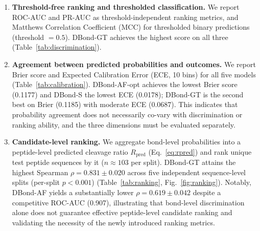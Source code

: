 \begin{enumerate}
    \item \textbf{Threshold-free ranking and thresholded classification.}
    We report ROC-AUC and PR-AUC as threshold-independent ranking metrics,
    and Matthews Correlation Coefficient (MCC) for thresholded binary
    predictions (threshold $=0.5$). DBond-GT achieves the highest score on
    all three (Table~\ref{tab:discrimination}).

    \item \textbf{Agreement between predicted probabilities and outcomes.}
    We report Brier score and Expected Calibration Error (ECE, 10 bins)
    for all five models (Table~\ref{tab:calibration}). DBond-AF-opt
    achieves the lowest Brier score (0.1177) and DBond-S the lowest ECE
    (0.0178); DBond-GT is the second best on Brier (0.1185) with moderate
    ECE (0.0687). This indicates that probability agreement does not
    necessarily co-vary with discrimination or ranking ability, and the
    three dimensions must be evaluated separately.

    \item \textbf{Candidate-level ranking.} We aggregate bond-level
    probabilities into a peptide-level predicted cleavage ratio
    $R_{\text{pred}}$ (Eq.~\ref{eq:rpred}) and rank unique test peptide
    sequences by it ($n \approx 103$ per split). DBond-GT attains the
    highest Spearman $\rho = 0.831 \pm 0.020$ across five independent
    sequence-level splits (per-split $p < 0.001$)
    (Table~\ref{tab:ranking}, Fig.~\ref{fig:ranking}). Notably, DBond-AF
    yields a substantially lower $\rho = 0.619 \pm 0.042$ despite a
    competitive ROC-AUC (0.907), illustrating that bond-level
    discrimination alone does not guarantee effective peptide-level
    candidate ranking and validating the necessity of the newly
    introduced ranking metrics.
\end{enumerate}
